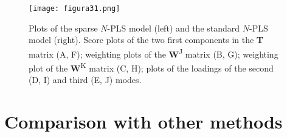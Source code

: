 \begin{figure}[hbtp]
	\centering
\texttt{[image: figura31.png]}
\caption{Plots of the sparse $N$-PLS model (left) and the standard $N$-PLS model (right). Score plots of the two first components in the \textbf{T} matrix (A, F); weighting plots of the \textbf{W}\textsuperscript{J} matrix (B, G); weighting plot of the \textbf{W}\textsuperscript{K} matrix (C, H); plots of the loadings of the second (D, I) and third (E, J) modes.}
\label{figura31}
\end{figure}

\section{Comparison with other methods}


